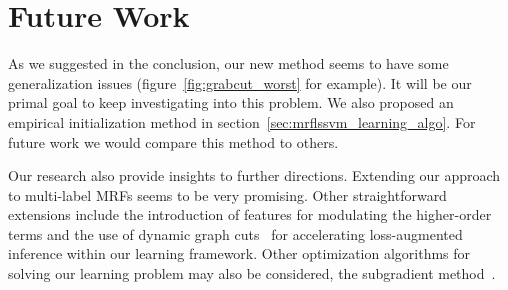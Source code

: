 \section{Future Work}
\label{sec:futurework}

As we suggested in the conclusion, our new method seems to have
some generalization issues (figure~\ref{fig:grabcut_worst} for
example). It will be our primal goal to keep investigating into
this problem. We also proposed an empirical initialization method
in section~\ref{sec:mrflssvm_learning_algo}. For future work we
would compare this method to others.

Our research also provide insights to further directions.
Extending our approach to multi-label MRFs seems to be very
promising. Other straightforward extensions include the
introduction of features for modulating the higher-order terms
and the use of dynamic graph cuts~\cite{Kohli:PAMI07} for
accelerating loss-augmented inference within our learning
framework. Other optimization algorithms for solving our learning
problem may also be considered, \eg the subgradient
method~\cite{Nowozin:2011, Bertsekas:2004}.






